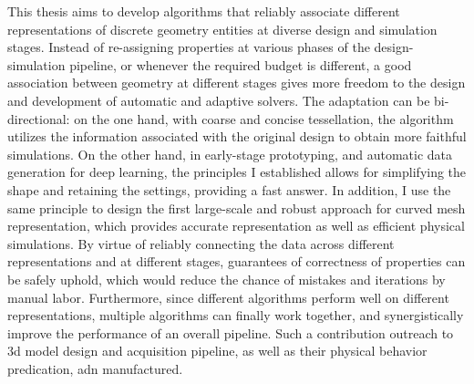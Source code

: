 This thesis aims to develop algorithms that reliably associate different representations of discrete geometry entities at diverse design and simulation stages. Instead of re-assigning properties at various phases of the design-simulation pipeline, or whenever the required budget is different, a good association between geometry at different stages gives more freedom to the design and development of automatic and adaptive solvers. The adaptation can be bi-directional: on the one hand, with coarse and concise tessellation, the algorithm utilizes the information associated with the original design to obtain more faithful simulations. On the other hand, in early-stage prototyping, and automatic data generation for deep learning, the principles I established allows for simplifying the shape and retaining the settings, providing a fast answer. In addition, I use the same principle to design the first large-scale and robust approach for curved mesh representation, which provides accurate representation as well as efficient physical simulations.
By virtue of reliably connecting the data across different representations and at different stages, guarantees of correctness of properties can be safely uphold, which would reduce the chance of mistakes and iterations by manual labor. 
Furthermore,  since different algorithms perform well on different representations, multiple algorithms can finally work together, and synergistically improve the performance of an overall pipeline.
Such a contribution outreach to 3d model design and acquisition pipeline, as well as their physical behavior predication, adn manufactured.

